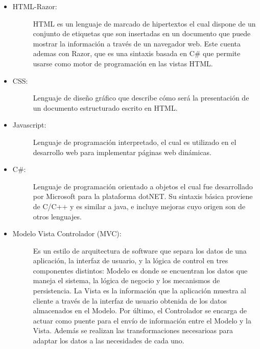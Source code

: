\begin{itemize}
    \item   \begin{description}
                \item[HTML-Razor:] HTML es un lenguaje de marcado de hipertextos el cual dispone de un conjunto de etiquetas que son insertadas en un documento que puede mostrar la información a través de un navegador web. Este cuenta ademas con Razor, que es una sintaxis basada en C\# que permite usarse como motor de programación en las vistas HTML. 
            \end{description}

    \item   \begin{description}
                \item[CSS:] Lenguaje de diseño gráfico que describe cómo será la presentación de un documento estructurado escrito en HTML. 
            \end{description}

    \item   \begin{description}
                \item[Javascript:] Lenguaje de programación interpretado, el cual es utilizado en el desarrollo web para implementar páginas web dinámicas.
            \end{description}

    \item   \begin{description}
                \item[C\#:] Lenguaje de programación orientado a objetos el cual fue desarrollado por Microsoft para la plataforma dotNET. Su sintaxis básica proviene de C/C++ y es similar a java, e incluye mejoras cuyo origen son de otros lenguajes.
            \end{description}
    
    \item   \begin{description}
                \item[Modelo Vista Controlador (MVC):]   Es un estilo de arquitectura de software que separa los datos de una aplicación, la interfaz de usuario, y la lógica de control en tres componentes distintos: Modelo es donde se encuentran los datos que maneja el sistema, la lógica de negocio y los mecanismos de persistencia. La Vista es la información que la aplicación muestra al cliente a través de la interfaz de usuario obtenida de los datos almacenados en el Modelo. Por último, el Controlador se encarga de actuar como puente para el envío de información entre el Modelo y la Vista. Además se realizan las transformaciones necesarioas para adaptar los datos a las necesidades de cada uno.
            \end{description}
    
\end{itemize}
